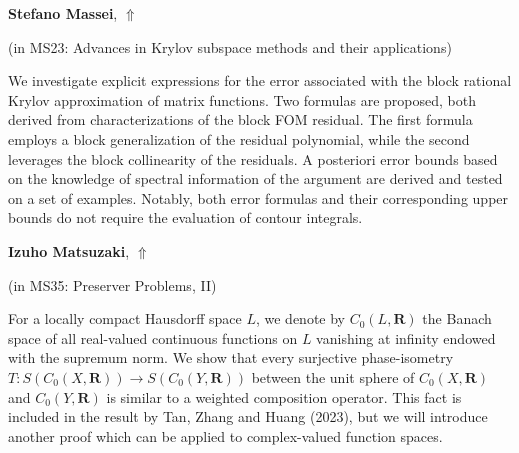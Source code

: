 \documentclass[ILAS2025-program.tex]{subfiles}
\begin{document}
\hypertarget{down0240}{}\begin{ilasabstract}
    
\textbf{Stefano Massei},  \hfill \hyperlink{up0240}{$\Uparrow$}
    
    
(in {\color{mstitle}MS23: Advances in Krylov subspace methods and their applications})
        
\mtskip
    We investigate explicit expressions for the error associated with the block rational Krylov approximation of matrix functions. Two formulas are proposed, both derived from  characterizations of the block FOM residual. The first formula employs a block generalization of the residual polynomial, while the second leverages the block collinearity of the residuals. A posteriori error bounds based on the knowledge 
of spectral information of the argument are derived and tested on a set of examples. Notably, both error formulas and their corresponding upper bounds do not require the evaluation of contour integrals.  

\end{ilasabstract}
    

\hypertarget{down0249}{}\begin{ilasabstract}
    
\textbf{Izuho Matsuzaki},  \hfill \hyperlink{up0249}{$\Uparrow$}
    
    
(in {\color{mstitle}MS35: Preserver Problems, II})
        
\mtskip
    For a locally compact Hausdorff space $L$, we denote by $C_0(L,\mathbf{R})$ the Banach space of all real-valued continuous functions on $L$ vanishing at infinity endowed with the supremum norm.
We show that every surjective phase-isometry $T\colon S(C_0(X,\mathbf{R}))\to S(C_0(Y,\mathbf{R}))$
between the unit sphere of $C_0(X,\mathbf{R})$ and $C_0(Y,\mathbf{R})$ is similar to a weighted
composition operator. 
This fact is included in the result by Tan, Zhang and Huang (2023), but we will introduce another proof which can be applied to complex-valued function spaces.
\end{ilasabstract}
    
\end{document}

